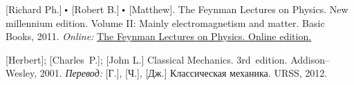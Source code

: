 \begin{thebibliography}{123}
\begin{otherlanguage}{russian}
%
%




[Richard Ph.] ${\hspace{-0.2ex}\bigdot}$ [Robert B.] ${\hspace{-0.2ex}\bigdot}$ [Matthew]. The Feynman Lectures on Physics. New millennium edition. Volume II: Mainly electromagnetism and matter. Basic Books, 2011. 
\emph{Online:}
\href{http://www.feynmanlectures.caltech.edu/}{The Feynman Lectures on Physics. Online edition.}

%

[Herbert]; [Charles~P.]; [John L.] Classical Mechanics. 3rd~edition. Addison\hbox{--}Wesley, 2001. 
\emph{Перевод:} [Г.], [Ч.], [Дж.] Классическая механика. URSS, 2012. 



\end{otherlanguage}
\end{thebibliography}
